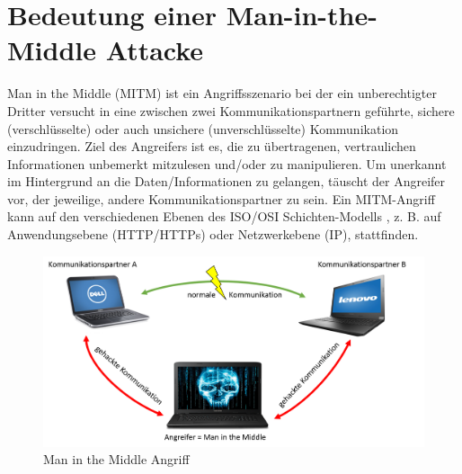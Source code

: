 \section{Bedeutung einer Man-in-the-Middle Attacke}
Man in the Middle (MITM) ist ein Angriffsszenario bei der ein unberechtigter Dritter versucht in eine zwischen zwei Kommunikationspartnern geführte, sichere (verschlüsselte) oder auch unsichere (unverschlüsselte) Kommunikation einzudringen. Ziel des Angreifers ist es, die zu übertragenen, vertraulichen Informationen unbemerkt mitzulesen und/oder zu manipulieren. Um unerkannt im Hintergrund an die Daten/Informationen zu gelangen, täuscht der Angreifer vor, der jeweilige, andere Kommunikationspartner zu sein. Ein MITM-Angriff kann auf den verschiedenen Ebenen des ISO/OSI Schichten-Modells \cite[vgl.]{osi}, z. B. auf Anwendungsebene (HTTP/HTTPs) oder Netzwerkebene (IP), stattfinden. 
\begin{figure}[H]
	\centering
	\includegraphics[width=1\linewidth]{images/MITM.png}
	\caption{Man in the Middle Angriff \cite{mitm-bild}}
\end{figure}
